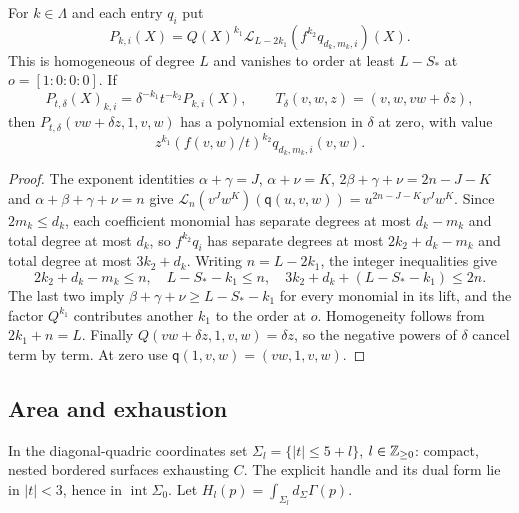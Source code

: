 \begin{lemma}\label{lem:sxm-lift}
For $k\in\Lambda$ and each entry $q_i$ put
\[
 P_{k,i}(X)=Q(X)^{k_1}\mathcal L_{L-2k_1}(f^{k_2}q_{d_k,m_k,i})(X).
\]
This is homogeneous of degree $L$ and vanishes to order at least $L-S_*$ at $o=[1:0:0:0]$. If
\[
 P_{t,\delta}(X)_{k,i}=\delta^{-k_1}t^{-k_2}P_{k,i}(X),\qquad
 T_\delta(v,w,z)=(v,w,vw+\delta z),
\]
then $P_{t,\delta}(vw+\delta z,1,v,w)$ has a polynomial extension in $\delta$ at zero, with value
\[
 z^{k_1}(f(v,w)/t)^{k_2}q_{d_k,m_k,i}(v,w).
\]
\end{lemma}

\begin{proof}
The exponent identities $\alpha+\gamma=J$, $\alpha+\nu=K$, $2\beta+\gamma+\nu=2n-J-K$ and
$\alpha+\beta+\gamma+\nu=n$ give $\mathcal L_n(v^Jw^K)(\mathsf q(u,v,w))=u^{2n-J-K}v^Jw^K$.
Since $2m_k\le d_k$, each coefficient monomial has separate degrees at most $d_k-m_k$ and
total degree at most $d_k$, so $f^{k_2}q_i$ has separate degrees at most $2k_2+d_k-m_k$ and
total degree at most $3k_2+d_k$. Writing $n=L-2k_1$, the integer inequalities give
\[
 2k_2+d_k-m_k\le n,\quad L-S_*-k_1\le n,\quad
 3k_2+d_k+(L-S_*-k_1)\le2n.
\]
The last two imply $\beta+\gamma+\nu\ge L-S_*-k_1$ for every monomial in its lift, and the
factor $Q^{k_1}$ contributes another $k_1$ to the order at $o$. Homogeneity follows from
$2k_1+n=L$. Finally $Q(vw+\delta z,1,v,w)=\delta z$, so the negative powers of $\delta$ cancel
term by term. At zero use $\mathsf q(1,v,w)=(vw,1,v,w)$.
\end{proof}

\subsection{Area and exhaustion}\label{sec:sxm-bordered}

In the diagonal-quadric coordinates set $\Sigma_l=\{|t|\le5+l\}$, $l\in\mathbb{Z}_{\ge0}$: compact,
nested bordered surfaces exhausting $C$. The explicit handle and its dual form lie in
$|t|<3$, hence in $\operatorname{int}\Sigma_0$. Let $H_l(p)=\int_{\Sigma_l}d_\Sigma\Gamma(p)$.

